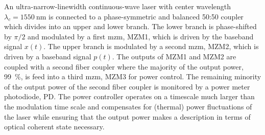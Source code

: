 An ultra-narrow-linewidth continuous-wave laser with center wavelength $\lambda_c=\SI{1550}{\nano\meter}$ is connected to a phase-symmetric and balanced 50:50 coupler which divides into an upper and lower branch.
The lower branch is phase-shifted by $\pi/2$ and modulated by a first \gls{mzm}, MZM1, which is driven by the baseband signal $x(t)$.
The upper branch is modulated by a second \gls{mzm}, MZM2, which is driven by a baseband signal $p(t)$.
The outputs of MZM1 and MZM2 are coupled with a second fiber coupler where the majority of the output power, \SI{99}{\percent}, is feed into a third \gls{mzm}, MZM3 for power control.
The remaining minority of the output power of the second fiber coupler is monitored by a power meter photodiode, PD.
The power controller operates on a timescale much larger than the modulation time scale and compensates for (thermal) power fluctuations of the laser while ensuring that the output power makes a description in terms of optical coherent state necessary.

